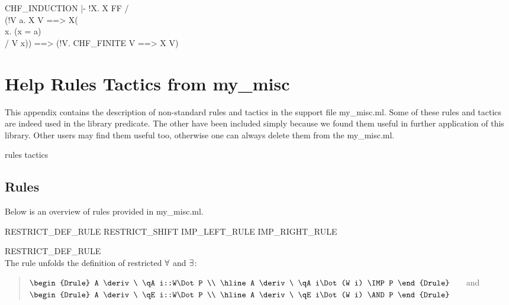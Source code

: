   CHF_INDUCTION   |- !X.
                       X FF /\\ (!V a. X V ==> X(\\x. (x = a) \\/ V x)) 
                       ==>
                       (!V. CHF_FINITE V ==> X V)
\endcode
{}


  

\chapter{Help Rules Tactics from my\_misc}
\label{misc}

This appendix contains the description of non-standard rules and
tactics in the support file \code{}my_misc.ml\edoc{}. Some of these rules and
tactics are indeed used in the library \code{}predicate\edoc{}. The other have
been included simply because we found them useful in further
application of this library. Other users may find them useful too,
otherwise one can always delete them from the \code{}my_misc.ml\edoc{}.

\enddocs
{}
\endmoddef
\LA{}rules\RA{}
\LA{}tactics\RA{}
\endcode
{}


\section{Rules}

Below is an overview of rules provided in \code{}my_misc.ml\edoc{}.

\enddocs
{}
\endmoddef
\LA{}RESTRICT\_DEF\_RULE\RA{}
\LA{}RESTRICT\_SHIFT\RA{}
\LA{}IMP\_LEFT\_RULE\RA{}
\LA{}IMP\_RIGHT\_RULE\RA{}
\endcode
{}


\begin{RULE}{RESTRICT\_DEF\_RULE} \\
The rule unfolds the definition of restricted $\forall$ and $\exists$:
\begin{quote}
$\begin{Drule}
   A \deriv\  \qA i::W\Dot P  \\ \hline
   A \deriv\  \qA i\Dot (W i) \IMP P
\end{Drule}$
\ \ \ and \ \ \
$\begin{Drule}
   A \deriv\ \qE i::W\Dot P  \\ \hline
   A \deriv\ \qE i\Dot (W i) \AND P 
\end{Drule}$
\end{quote}
\end{RULE}


